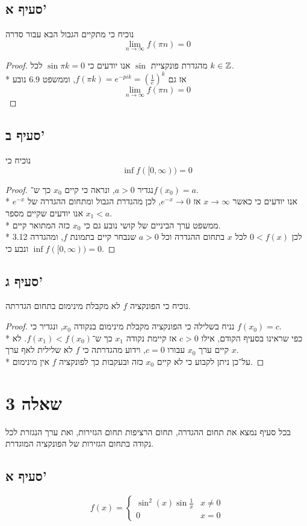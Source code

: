 \subsection{סעיף א'}
נוכיח כי מתקיים הגבול הבא עבור סדרה
\[
	\lim_{n \to \infty} f(\pi n) = 0
\]
\begin{proof}
	מהגדרת פונקציית $\sin$ אנו יודעים כי $\sin \pi k = 0$ לכל $k \in \mathbb{Z}$. \\*
	אז גם $f(\pi k) = e^{-pi k} = {(\frac{1}{e})}^k$, וממשפט 6.9 נובע
	\[
		\lim_{n \to \infty} f(\pi n) = 0
	\]
\end{proof}

\subsection{סעיף ב'}
נוכיח כי
\[
	\inf f([0, \infty)) = 0 %
\]
\begin{proof}
	נגדיר $a > 0$, ונראה כי קיים $x_0$ כך ש־$f(x_0) = a$. \\*
	אנו יודעים כי כאשר $x \to \infty$ אז $e^{-x} \to 0$, לכן מהגדרת הגבול ומתחום ההגדרה של $e^{-x}$ אנו יודעים שקיים מספר $x_1 < a$. \\*
	ממשפט ערך הביניים של קושי נובע גם כי $x_0$ כזה המתואר קיים. \\*
	לכן $0 < f(x)$ לכל $x$ בתחום ההגדרה וכל $a > 0$ שנבחר קיים בתמונת $f$, ומהגדרה 3.12 ונבע כי $\inf f([0, \infty)) = 0$. %
\end{proof}

\subsection{סעיף ג'}
נוכיח כי הפונקציה $f$ לא מקבלת מינימום בתחום הגדרתה.
\begin{proof}
	נניח בשלילה כי הפונקציה מקבלת מינימום בנקודה $x_0$, ונגדיר כי $f(x_0) = c$. \\*
	כפי שראינו בסעיף הקודם, אילו $c > 0$ אז קיימת נקודה $x_1$ כך ש־$f(x_1) < f(x_0)$.
	לא קיים ערך $x_0$ עבורו $c = 0$, וידוע מהגדרתה כי $f$ לא שלילית לאף ערך $x$. \\*
	על־כן ניתן לקבוע כי לא קיים $x_0$ כזה ובעקבות כך לפונקציה $f$ אין מינימום.
\end{proof}

\section{שאלה 3}
בכל סעיף נמצא את תחום ההגדרה, תחום הרציפות תחום הגזירות, ואת ערך הנגזרת לכל נקודה בתחום הגזירות של הפונקציה המוגדרת.

\subsection{סעיף א'}
\[
	f(x) = \begin{cases}
		\sin^2(x) \sin \frac{1}{x} & x \ne 0 \\
		0 & x = 0
	\end{cases}
\]

